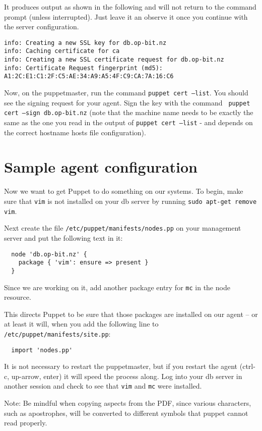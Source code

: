 \documentclass{article}
\newcommand{\domain}{op-bit.nz}
\begin{document}
It produces output as shown in the following and will not return to the command prompt (unless interrupted). Just leave it an observe it once you continue with the server configuration.

\begin{verbatim}
info: Creating a new SSL key for db.op-bit.nz
info: Caching certificate for ca
info: Creating a new SSL certificate request for db.op-bit.nz
info: Certificate Request fingerprint (md5): A1:2C:E1:C1:2F:C5:AE:34:A9:A5:4F:C9:CA:7A:16:C6

\end{verbatim}

Now, on the puppetmaster, run the command \texttt{puppet cert --list}.  You should see the signing request for your agent.  Sign the key with the command \texttt{ puppet cert --sign db.\domain} (note that the machine name needs to be exactly the same as the one you read in the output of \texttt{puppet cert --list} - and depends on the correct hostname hosts file configuration).

\section{Sample agent configuration}
Now we want to get Puppet to do something on our systems.  To begin, make sure that \texttt{vim} is not installed on your db server by running \texttt{sudo apt-get remove vim}. 

Next create the file \texttt{/etc/puppet/manifests/nodes.pp} on your management server and put the following text in it:
\begin{verbatim}
  node 'db.op-bit.nz' {
    package { 'vim': ensure => present }
  }
\end{verbatim}

Since we are working on it, add another package entry for \texttt{mc} in the node resource.

This directs Puppet to be sure that those packages are installed on our agent -- or at least it will, when you add the following line to \texttt{/etc/puppet/manifests/site.pp}:

\begin{verbatim}
  import 'nodes.pp'
\end{verbatim}

It is not necessary to restart the puppetmaster, but if you restart the agent (ctrl-c, up-arrow, enter) it will speed the process along.  Log into your db server in another session and check to see that \texttt{vim} and \texttt{mc} were installed. 

Note: Be mindful when copying aspects from the PDF, since various characters, such as apostrophes, will be converted to different symbols that puppet cannot read properly.
\end{document}
